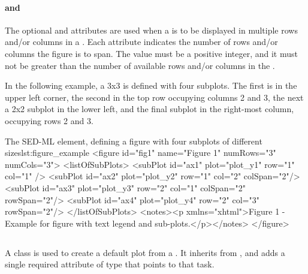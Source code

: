 \begin{blockChanged}
\paragraph*{ and }
The optional  and  attributes are used when a \Plot is to be displayed in multiple rows and/or columns in a \Figure.  Each attribute indicates the number of rows and/or columns the figure is to span.  The value must be a positive integer, and it must not be greater than the number of available rows and/or columns in the \Figure.

In the following example, a 3x3 \Figure is defined with four subplots.  The first is in the upper left corner, the second in the top row occupying columns 2 and 3, the next a 2x2 subplot in the lower left, and the final subplot in the right-most column, occupying rows 2 and 3.

\begin{myXmlLst}{The SED-ML  element, defining a figure with four subplots of different sizes}{lst:figure_example}
<figure id="fig1" name="Figure 1" numRows="3" numCols="3">
    <listOfSubPlots>
        <subPlot id="ax1" plot="plot_y1" row="1" col="1" />
        <subPlot id="ax2" plot="plot_y2" row="1" col="2" colSpan="2"/>
        <subPlot id="ax3" plot="plot_y3" row="2" col="1" colSpan="2" rowSpan="2"/>
        <subPlot id="ax4" plot="plot_y4" row="2" col="3" rowSpan="2"/>
    </listOfSubPlots>
    <notes><p xmlns="xhtml">Figure 1 - Example for figure with text legend and sub-plots.</p></notes>
</figure>
\end{myXmlLst}



\subsection{}
\label{class:parameterEstimationResultsPlot}
A \ParameterEstimationResultsPlot class is used to create a default plot from a \ParameterEstimationTask.  It inherits from \Plot, and adds a single required attribute  of type \SIdRef that points to that task.



\end{blockChanged}
